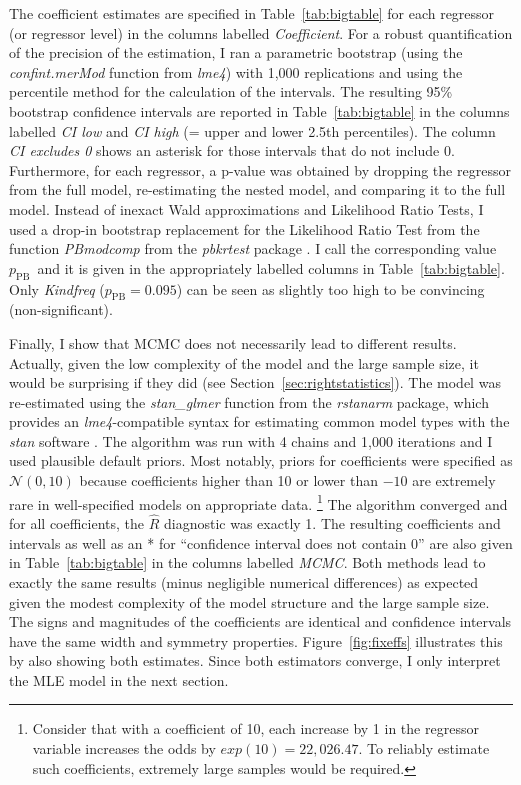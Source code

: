 \documentclass[USenglish]{article}
\newcommand{\mpPB}{\ensuremath{p_{\text{PB}}}}
\begin{document}
The coefficient estimates are specified in Table~\ref{tab:bigtable} for each regressor (or regressor level) in the columns labelled \textit{Coefficient}.
For a robust quantification of the precision of the estimation, I ran a parametric bootstrap (using the \mbox{\textit{confint.merMod}} function from \textit{lme4}) with 1,000 replications and using the percentile method for the calculation of the intervals.
The resulting 95\% bootstrap confidence intervals are reported in Table~\ref{tab:bigtable} in the columns labelled \textit{CI low} and \textit{CI high} (= upper and lower 2.5th percentiles).
The column \textit{CI excludes 0} shows an asterisk for those intervals that do not include 0.
Furthermore, for each regressor, a p-value was obtained by dropping the regressor from the full model, re-estimating the nested model, and comparing it to the full model.
Instead of inexact Wald approximations and Likelihood Ratio Tests, I used a drop-in bootstrap replacement for the Likelihood Ratio Test from the function \textit{PBmodcomp} from the \textit{pbkrtest} package \citep{HalekohHojsgaard2014}.
I call the corresponding value $p_{\text{PB}}$\ and it is given in the appropriately labelled columns in Table~\ref{tab:bigtable}.
Only \textit{Kindfreq} ($\mpPB=0.095$) can be seen as slightly too high to be convincing (non-significant).

Finally, I show that MCMC does not necessarily lead to different results.
Actually, given the low complexity of the model and the large sample size, it would be surprising if they did (see Section~\ref{sec:rightstatistics}).
The model was re-estimated using the \textit{stan\_glmer} function from the \textit{rstanarm} package, which provides an \textit{lme4}-compatible syntax for estimating common model types with the \textit{stan} software \citep{CarpenterEa2017}.
The algorithm was run with 4 chains and 1,000 iterations and I used plausible default priors.
Most notably, priors for coefficients were specified as $\mathcal{N}(0,10)$ because coefficients higher than 10 or lower than $-10$ are extremely rare in well-specified models on appropriate data.%
\footnote{Consider that with a coefficient of 10, each increase by 1 in the regressor variable increases the odds by $exp(10)=22,026.47$.
To reliably estimate such coefficients, extremely large samples would be required.}
The algorithm converged and for all coefficients, the $\hat{R}$ diagnostic was exactly 1.
The resulting coefficients and intervals as well as an * for ``confidence interval does not contain 0'' are also given in Table~\ref{tab:bigtable} in the columns labelled \textit{MCMC}.
Both methods lead to exactly the same results (minus negligible numerical differences) as expected given the modest complexity of the model structure and the large sample size.
The signs and magnitudes of the coefficients are identical and confidence intervals have the same width and symmetry properties.
Figure~\ref{fig:fixeffs} illustrates this by also showing both estimates.
Since both estimators converge, I only interpret the MLE model in the next section.
\end{document}
